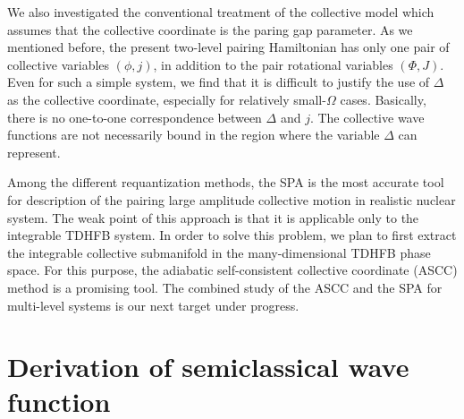 \documentclass[%
superscriptaddress,
preprint,
showpacs,
nofootinbib,
amsmath,amssymb,
aps,
prc,
floatfix ]%
{revtex4-1}
\begin{document}
We also investigated the conventional treatment of
the collective model which assumes that the collective coordinate is
the paring gap parameter.
As we mentioned before, the present two-level pairing Hamiltonian has
only one pair of collective variables $(\phi,j)$, in addition to the
pair rotational variables $(\Phi,J)$.
Even for such a simple system, we find that it is difficult to justify
the use of $\Delta$ as the collective coordinate,
especially for relatively small-$\Omega$ cases.
Basically, there is no one-to-one correspondence between $\Delta$ and $j$.
The collective wave functions are not necessarily bound in the region
where the variable $\Delta$ can represent.


Among the different requantization methods,
the SPA is the most accurate tool for description of
the pairing large amplitude collective motion in realistic nuclear system.
The weak point of this approach is that it is applicable only to the
integrable TDHFB system.
In order to solve this problem, we plan to first extract the
integrable collective submanifold in the many-dimensional TDHFB phase space.
For this purpose, the adiabatic self-consistent collective coordinate (ASCC)
method \cite{NMMY16} is a promising tool.
The combined study of the ASCC and the SPA for multi-level systems is our
next target under progress.


\appendix
\section{Derivation of semiclassical wave function}
\end{document}
